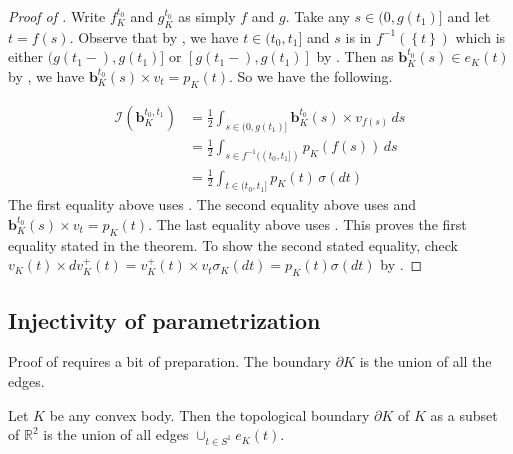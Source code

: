 \begin{proof}[Proof of ]
Write \(f_K^{t_0}\) and \(g_K^{t_0}\) as simply \(f\) and \(g\). Take any \(s \in (0, g(t_1)]\) and let \(t = f(s)\). Observe that by , we have \(t \in (t_0, t_1]\) and \(s\) is in \(f^{-1}(\left\{ t \right\})\) which is either \((g(t_1 -), g(t_1)]\) or \([g(t_1 -), g(t_1)]\) by . Then as \(\mathbf{b}_{K}^{t_0} (s) \in e_K(t)\) by , we have \(\mathbf{b}_{K}^{t_0} (s) \times v_{t} = p_K(t)\). So we have the following.

\begin{align*}
\mathcal{I} \left( \mathbf{b}_{K}^{t_0, t_1} \right) & = \frac{1}{2} \int_{s \in (0, g(t_1)]} \mathbf{b}_{K}^{t_0} (s) \times v_{f(s)} \, ds \\
& = \frac{1}{2} \int_{s \in f^{-1}((t_0, t_1])} p_K(f(s)) \, ds \\
& = \frac{1}{2} \int_{t \in(t_0, t_1]} p_K(t) \, \sigma(dt)
\end{align*}
The first equality above uses . The second equality above uses  and \(\mathbf{b}_{K}^{t_0} (s) \times v_{t} = p_K(t)\). The last equality above uses . This proves the first equality stated in the theorem. To show the second stated equality, check \(v_K(t) \times dv_K^+(t) = v_K^+(t) \times v_{t} \sigma_K(dt) = p_K(t) \sigma(dt)\) by .
\end{proof}

\subsection{Injectivity of parametrization}

Proof of  requires a bit of preparation. The boundary \(\partial K\) is the union of all the edges.

\begin{theorem}

Let \(K\) be any convex body. Then the topological boundary \(\partial K\) of \(K\) as a subset of \(\mathbb{R}^2\) is the union of all edges \(\cup_{t \in S^1} e_K(t)\).

\label{thm:boundary-is-union-all-edges}
\end{theorem}


